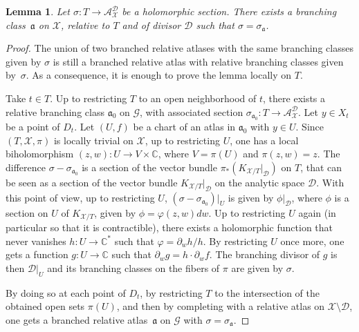 \documentclass[10pt]{amsart}
\newcommand{\C}{\mathbb C}
\theoremstyle{definition}
\theoremstyle{plain}
\newtheorem{lemma}[definition]{Lemma}
\begin{document}
\begin{lemma}\label{lemma_branched_atlas_holomorphic_section}
Let $\sigma: T \to \mathcal A_{\mathcal X}^{\mathcal D}$ be a holomorphic section.
There exists a branching class~$\mathfrak a$ on $\mathcal X$, relative to $T$ and of divisor $\mathcal D$ such that $\sigma = \sigma_{\mathfrak a}$.
\end{lemma}

\begin{proof}
The union of two branched relative atlases with the same branching classes given by $\sigma$ is still a branched relative atlas with relative branching classes given by~$\sigma$.
As a consequence, it is enough to prove the lemma locally on $T$.

Take $t \in T$.
Up to restricting $T$ to an open neighborhood of $t$, there exists a relative branching class $\mathfrak a_0$ on $\mathcal G$, with associated section $\sigma_{\mathfrak a_0}: T \to \mathcal A_{\mathcal X}^{\mathcal D}$.
Let $y \in X_t$ be a point of $D_t$.
Let $(U, f)$ be a chart of an atlas in $\mathfrak a_0$ with $y \in U$.
Since $(T, \mathcal X, \pi)$ is locally trivial on $\mathcal X$, up to restricting $U$, one has a local biholomorphism $(z, w): U \to V \times \C$, where $V = \pi(U)$ and $\pi(z, w) = z$.
The difference $\sigma-\sigma_{\mathfrak a_0}$ is a section of the vector bundle $\pi_*(K_{\mathcal X/T}|_{\mathcal D})$ on $T$, that can be seen as a section of the vector bundle $K_{\mathcal X / T}|_{\mathcal D}$ on the analytic space $\mathcal D$.
With this point of view, up to restricting $U$, $(\sigma-\sigma_{\mathfrak a_0})|_U$ is given by $\phi|_{\mathcal D}$, where $\phi$ is a section on $U$ of $K_{\mathcal X/T}$, given by $\phi = \varphi(z, w)dw$.
Up to restricting $U$ again (in particular so that it is contractible), there exists a holomorphic function that never vanishes $h: U \to \mathbb C^*$ such that $\varphi = \partial_w h / h$. By restricting $U$ once more, one gets a function $g: U \to \mathbb C$ such that $\partial_w g = h \cdot \partial_w f$.
The branching divisor of $g$ is then $\mathcal D|_U$ and its branching classes on the fibers of $\pi$ are given by $\sigma$.

By doing so at each point of $D_t$, by restricting $T$ to the intersection of the obtained open sets $\pi(U)$, and then by completing with a relative atlas on $\mathcal X \setminus \mathcal D$, one gets a branched relative atlas~$\mathfrak a$ on $\mathcal G$ with $\sigma = \sigma_{\mathfrak a}$.
\end{proof}
\end{document}
